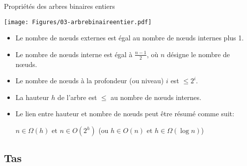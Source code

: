 \begin{frame}{Propriétés des arbres binaires entiers}
\label{sec3:proparbres}
\centerline{\texttt{[image: Figures/03-arbrebinaireentier.pdf]}}

\begin{itemize}
\item Le nombre de n\oe uds externes est égal au nombre de n\oe uds internes plus 1.
\item Le nombre de n\oe uds interne est égal à $\frac{n-1}{2}$, où
  $n$ désigne le nombre de n\oe uds.
\item Le nombre de n\oe uds à la profondeur (ou niveau) $i$ est $\leq 2^i$.
\item La hauteur $h$ de l'arbre est $\leq$ au nombre de n\oe uds internes.
\item Le lien entre hauteur et nombre de n\oe uds peut être résumé comme suit:
\begin{center}
$n\in \Omega(h)\mbox{ et }n\in O(2^h)$ (ou $h\in O(n)\mbox{ et }h\in \Omega(\log n)$)
\end{center}
\end{itemize}

\end{frame}

\subsection{Tas}

